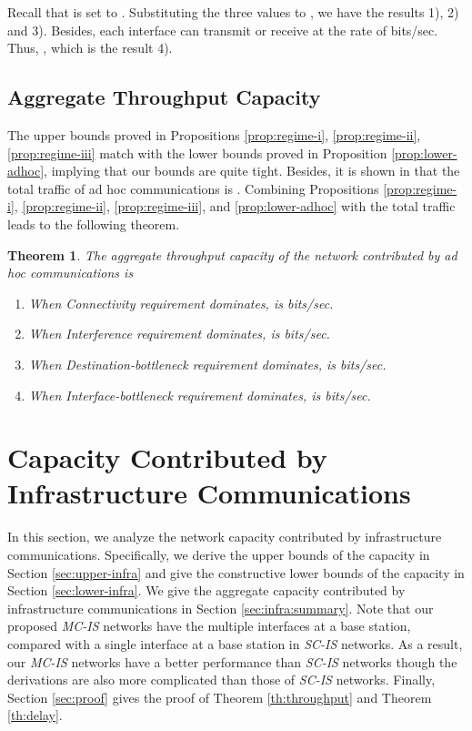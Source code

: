 \documentclass[10pt,journal]{IEEEtran}
\newtheorem{theorem}{Theorem}
\def\done{\hspace*{\fill} }
\begin{document}
Recall that  is set to . Substituting the three values to , we have the results 1), 2) and 3). Besides, each interface can transmit or receive at the rate of  bits/sec. Thus, , which is the result 4).
\done

\subsection{Aggregate Throughput Capacity}
\label{sec:summary:ah}

The upper bounds proved in Propositions \ref{prop:regime-i}, \ref{prop:regime-ii}, \ref{prop:regime-iii} match with the lower bounds proved in Proposition \ref{prop:lower-adhoc}, implying that our bounds are quite tight. Besides, it is shown in \cite{panli:jsac09} that the total traffic of ad hoc communications is . Combining Propositions \ref{prop:regime-i}, \ref{prop:regime-ii}, \ref{prop:regime-iii}, and \ref{prop:lower-adhoc} with the total traffic leads to the following theorem.

\begin{theorem}
\label{theorem:ad_hoc}
The aggregate throughput capacity of the network contributed by ad hoc communications is
\begin{enumerate}
\item[1)] When Connectivity requirement dominates,  is  bits/sec.
\item[2)] When Interference requirement dominates,  is  bits/sec.
\item[3)] When Destination-bottleneck requirement dominates,  is  bits/sec.
\item[4)] When Interface-bottleneck requirement dominates,  is  bits/sec.
\end{enumerate}
\end{theorem}

\section{Capacity Contributed by Infrastructure Communications}
\label{sec:infra}

In this section, we analyze the network capacity contributed by infrastructure communications. Specifically, we derive the upper bounds of the capacity in Section \ref{sec:upper-infra} and give the constructive lower bounds of the capacity in Section \ref{sec:lower-infra}. We give the aggregate capacity contributed by infrastructure communications in Section \ref{sec:infra:summary}. Note that our proposed \emph{MC-IS} networks have the multiple interfaces at a base station, compared with a single interface at a base station in \emph{SC-IS} networks. As a result, our \emph{MC-IS} networks have a better performance than \emph{SC-IS} networks though the derivations are also more complicated than those of \emph{SC-IS} networks. Finally, Section \ref{sec:proof} gives the proof of Theorem \ref{th:throughput} and Theorem \ref{th:delay}.
\end{document}
